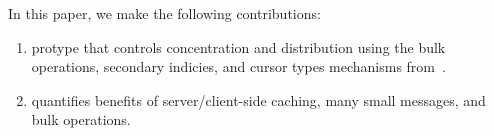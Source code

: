 In this paper, we make the following contributions:

\begin{enumerate}

  \item protype that controls concentration and distribution using the bulk
  operations, secondary indicies, and cursor types mechanisms
  from~\cite{greenberg:hotstorage2015-mdhim}. 

  \item quantifies benefits of server/client-side caching, many small messages,
  and bulk operations.

\end{enumerate}
